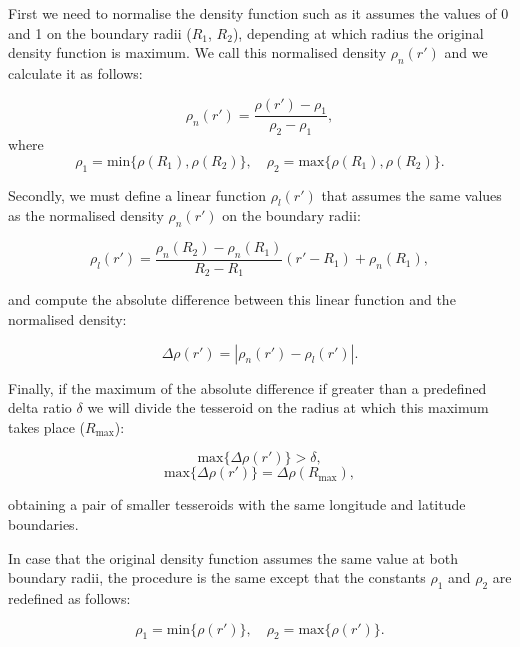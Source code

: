 \documentclass[extra]{gji}
\begin{document}
First we need to normalise the density function such as it assumes the values of 0 and 1 on the boundary radii ($R_1$, $R_2$), depending at which radius the original density function is maximum.
We call this normalised density $\rho_n(r')$ and we calculate it as follows:

\begin{equation}
    \rho_n(r') = \frac{\rho(r') - \rho_1}{\rho_2 - \rho_1},
\end{equation}
\noindent where
\begin{equation}
    \rho_1 = \text{min}\{ \rho(R_1), \rho(R_2) \}, \quad
    \rho_2 = \text{max}\{ \rho(R_1), \rho(R_2) \}.
\end{equation}

Secondly, we must define a linear function $\rho_l(r')$ that assumes the same values as the normalised density $\rho_n(r')$ on the boundary radii:

\begin{equation}
    \rho_l(r') =
    \frac{ \rho_n(R_2) - \rho_n(R_1) }{ R_2 - R_1 } (r' - R_1) + \rho_n(R_1),
\end{equation}

\noindent and compute the absolute difference between this linear function and the normalised density:

\begin{equation}
    \Delta \rho (r') = | \rho_n(r') - \rho_l(r') |.
\end{equation}

Finally, if the maximum of the absolute difference if greater than a predefined delta ratio $\delta$ we will divide the tesseroid on the radius at which this maximum takes place ($R_\text{max}$):

\begin{equation}
    \text{max}\{ \Delta \rho(r') \} > \delta,
    \label{eq:delta-density}
\end{equation}
\begin{equation}
    \text{max}\{ \Delta \rho(r') \} = \Delta \rho(R_\text{max}),
\end{equation}

\noindent obtaining a pair of smaller tesseroids with the same longitude and latitude boundaries.

In case that the original density function assumes the same value at both boundary radii, the procedure is the same except that the constants $\rho_1$ and $\rho_2$ are redefined as follows:

\begin{equation}
    \rho_1 = \text{min}\{ \rho(r') \}, \quad
    \rho_2 = \text{max}\{ \rho(r') \}.
\end{equation}
\end{document}
